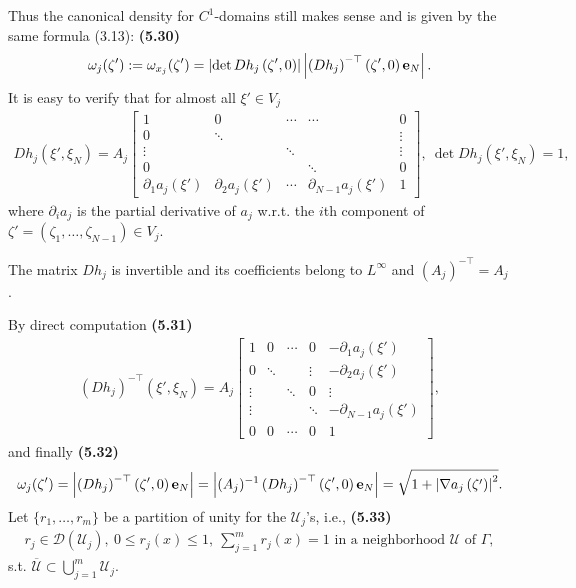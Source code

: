 \documentclass{book}
\numberwithin{equation}{section}
\begin{document}
\begin{enumerate}
\begin{enumerate}
        Thus the canonical density for $C^1$-domains still makes sense and is given by the same formula (3.13): \textbf{(5.30)}
        \begin{align*}
            \omega_j(\zeta') := \omega_{x_j}(\zeta') = \left|\det Dh_j\left(\zeta',0\right)\right|\left|\left(Dh_j\right)^{-\top}\left(\zeta',0\right){\bf e}_N\right|.
        \end{align*}
        It is easy to verify that for almost all $\xi'\in V_j$
        \begin{align*}
            Dh_j\left(\xi',\xi_N\right) = A_j\begin{bmatrix}
                1 & 0 & \cdots & \cdots & 0\\ 0 & \ddots & & & \vdots\\ \vdots & & \ddots & & \vdots\\ 0 & & & \ddots & 0\\ \partial_1a_j(\xi') & \partial_2a_j(\xi') & \cdots & \partial_{N - 1}a_j(\xi') & 1
            \end{bmatrix},\ \det Dh_j\left(\xi',\xi_N\right) = 1,
        \end{align*}
        where $\partial_ia_j$ is the partial derivative of $a_j$ w.r.t. the $i$th component of $\zeta' = \left(\zeta_1,\ldots,\zeta_{N - 1}\right)\in V_j$.
        
        The matrix $Dh_j$ is invertible and its coefficients belong to $L^\infty$ and $(A_j)^{-\top} = A_j$.
        
        By direct computation \textbf{(5.31)}
        \begin{align*}
            \left(Dh_j\right)^{-\top}\left(\xi',\xi_N\right) = A_j\begin{bmatrix}
                1 & 0 & \cdots & 0 & -\partial_1a_j(\xi')\\ 0 & \ddots & & \vdots & -\partial_2a_j(\xi')\\ \vdots & & \ddots & 0 & \vdots\\ \vdots & & & \ddots & -\partial_{N - 1}a_j(\xi')\\
                0 & 0 & \cdots & 0 & 1
            \end{bmatrix},
        \end{align*}
        and finally \textbf{(5.32)}
        \begin{align*}
            \omega_j(\zeta') = \left|\left(Dh_j\right)^{-\top}\left(\zeta',0\right){\bf e}_N\right| = \left|(A_j)^{-1}\left(Dh_j\right)^{-\top}\left(\zeta',0\right){\bf e}_N\right| = \sqrt{1 + \left|\nabla a_j\left(\zeta'\right)\right|^2}.
        \end{align*}
        Let $\{r_1,\ldots,r_m\}$ be a partition of unity for the $\mathcal{U}_j$'s, i.e., \textbf{(5.33)}
        \begin{align*}
            r_j\in\mathcal{D}\left(\mathcal{U}_j\right),\ 0\le r_j(x)\le 1,\ \sum_{j=1}^m r_j(x) = 1 \mbox{ in a neighborhood } \mathcal{U} \mbox{ of } \Gamma,
        \end{align*}
        s.t. $\overline{\mathcal{U}}\subset\bigcup_{j = 1}^m \mathcal{U}_j$.
        

\end{enumerate}
\end{enumerate}
\end{document}
